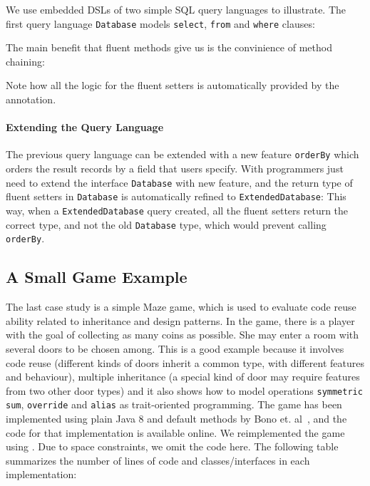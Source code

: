 \noindent We use embedded DSLs of two simple SQL query languages to illustrate.
The first query language \texttt{Database}  models
\texttt{select}, \texttt{from} and \texttt{where} clauses:

\noindent The main benefit that fluent methods give
us is the convinience of method chaining:


\noindent Note how all the logic for the fluent setters is automatically provided by the \mixin annotation. 

\paragraph{Extending the Query Language} The previous query language can be extended with a new feature
\texttt{orderBy} which orders the result records by a field that users
specify. With \mixin programmers just need to extend the interface \texttt{Database} with new
feature, and the return type of fluent setters in
\texttt{Database} is automatically refined to \texttt{ExtendedDatabase}:
This way, when a \texttt{ExtendedDatabase} query created, 
all the fluent setters return the correct type, and not the old \texttt{Database} type, which would prevent calling 
\texttt{orderBy}.


\subsection{A Small Game Example}
The last case study is a simple Maze game, which is used
to evaluate code reuse ability related to inheritance and design
patterns. In the game, there is a player with the goal of collecting
as many coins as possible. She may enter a room with several doors to
be chosen among. This is a good example because it involves code reuse
(different kinds of doors inherit a common type, with different
features and behaviour), multiple inheritance (a special kind of door
may require features from two other door types) and it also shows how
to model operations \texttt{symmetric sum}, \texttt{override} and
\texttt{alias} as trait-oriented programming. The game has been
implemented using plain Java 8 and default methods by Bono
et. al~\cite{bono14}, and the code for that implementation is
available online. We reimplemented the game using \mixin. Due to space
constraints, we omit the code here. The following table summarizes
the number of lines of code and classes/interfaces in each implementation:

